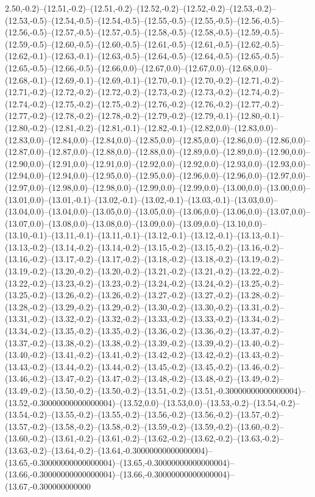 2.50,-0.2)--(12.51,-0.2)--(12.51,-0.2)--(12.52,-0.2)--(12.52,-0.2)--(12.53,-0.2)--(12.53,-0.5)--(12.54,-0.5)--(12.54,-0.5)--(12.55,-0.5)--(12.55,-0.5)--(12.56,-0.5)--(12.56,-0.5)--(12.57,-0.5)--(12.57,-0.5)--(12.58,-0.5)--(12.58,-0.5)--(12.59,-0.5)--(12.59,-0.5)--(12.60,-0.5)--(12.60,-0.5)--(12.61,-0.5)--(12.61,-0.5)--(12.62,-0.5)--(12.62,-0.1)--(12.63,-0.1)--(12.63,-0.5)--(12.64,-0.5)--(12.64,-0.5)--(12.65,-0.5)--(12.65,-0.5)--(12.66,-0.5)--(12.66,0.0)--(12.67,0.0)--(12.67,0.0)--(12.68,0.0)--(12.68,-0.1)--(12.69,-0.1)--(12.69,-0.1)--(12.70,-0.1)--(12.70,-0.2)--(12.71,-0.2)--(12.71,-0.2)--(12.72,-0.2)--(12.72,-0.2)--(12.73,-0.2)--(12.73,-0.2)--(12.74,-0.2)--(12.74,-0.2)--(12.75,-0.2)--(12.75,-0.2)--(12.76,-0.2)--(12.76,-0.2)--(12.77,-0.2)--(12.77,-0.2)--(12.78,-0.2)--(12.78,-0.2)--(12.79,-0.2)--(12.79,-0.1)--(12.80,-0.1)--(12.80,-0.2)--(12.81,-0.2)--(12.81,-0.1)--(12.82,-0.1)--(12.82,0.0)--(12.83,0.0)--(12.83,0.0)--(12.84,0.0)--(12.84,0.0)--(12.85,0.0)--(12.85,0.0)--(12.86,0.0)--(12.86,0.0)--(12.87,0.0)--(12.87,0.0)--(12.88,0.0)--(12.88,0.0)--(12.89,0.0)--(12.89,0.0)--(12.90,0.0)--(12.90,0.0)--(12.91,0.0)--(12.91,0.0)--(12.92,0.0)--(12.92,0.0)--(12.93,0.0)--(12.93,0.0)--(12.94,0.0)--(12.94,0.0)--(12.95,0.0)--(12.95,0.0)--(12.96,0.0)--(12.96,0.0)--(12.97,0.0)--(12.97,0.0)--(12.98,0.0)--(12.98,0.0)--(12.99,0.0)--(12.99,0.0)--(13.00,0.0)--(13.00,0.0)--(13.01,0.0)--(13.01,-0.1)--(13.02,-0.1)--(13.02,-0.1)--(13.03,-0.1)--(13.03,0.0)--(13.04,0.0)--(13.04,0.0)--(13.05,0.0)--(13.05,0.0)--(13.06,0.0)--(13.06,0.0)--(13.07,0.0)--(13.07,0.0)--(13.08,0.0)--(13.08,0.0)--(13.09,0.0)--(13.09,0.0)--(13.10,0.0)--(13.10,-0.1)--(13.11,-0.1)--(13.11,-0.1)--(13.12,-0.1)--(13.12,-0.1)--(13.13,-0.1)--(13.13,-0.2)--(13.14,-0.2)--(13.14,-0.2)--(13.15,-0.2)--(13.15,-0.2)--(13.16,-0.2)--(13.16,-0.2)--(13.17,-0.2)--(13.17,-0.2)--(13.18,-0.2)--(13.18,-0.2)--(13.19,-0.2)--(13.19,-0.2)--(13.20,-0.2)--(13.20,-0.2)--(13.21,-0.2)--(13.21,-0.2)--(13.22,-0.2)--(13.22,-0.2)--(13.23,-0.2)--(13.23,-0.2)--(13.24,-0.2)--(13.24,-0.2)--(13.25,-0.2)--(13.25,-0.2)--(13.26,-0.2)--(13.26,-0.2)--(13.27,-0.2)--(13.27,-0.2)--(13.28,-0.2)--(13.28,-0.2)--(13.29,-0.2)--(13.29,-0.2)--(13.30,-0.2)--(13.30,-0.2)--(13.31,-0.2)--(13.31,-0.2)--(13.32,-0.2)--(13.32,-0.2)--(13.33,-0.2)--(13.33,-0.2)--(13.34,-0.2)--(13.34,-0.2)--(13.35,-0.2)--(13.35,-0.2)--(13.36,-0.2)--(13.36,-0.2)--(13.37,-0.2)--(13.37,-0.2)--(13.38,-0.2)--(13.38,-0.2)--(13.39,-0.2)--(13.39,-0.2)--(13.40,-0.2)--(13.40,-0.2)--(13.41,-0.2)--(13.41,-0.2)--(13.42,-0.2)--(13.42,-0.2)--(13.43,-0.2)--(13.43,-0.2)--(13.44,-0.2)--(13.44,-0.2)--(13.45,-0.2)--(13.45,-0.2)--(13.46,-0.2)--(13.46,-0.2)--(13.47,-0.2)--(13.47,-0.2)--(13.48,-0.2)--(13.48,-0.2)--(13.49,-0.2)--(13.49,-0.2)--(13.50,-0.2)--(13.50,-0.2)--(13.51,-0.2)--(13.51,-0.30000000000000004)--(13.52,-0.30000000000000004)--(13.52,0.0)--(13.53,0.0)--(13.53,-0.2)--(13.54,-0.2)--(13.54,-0.2)--(13.55,-0.2)--(13.55,-0.2)--(13.56,-0.2)--(13.56,-0.2)--(13.57,-0.2)--(13.57,-0.2)--(13.58,-0.2)--(13.58,-0.2)--(13.59,-0.2)--(13.59,-0.2)--(13.60,-0.2)--(13.60,-0.2)--(13.61,-0.2)--(13.61,-0.2)--(13.62,-0.2)--(13.62,-0.2)--(13.63,-0.2)--(13.63,-0.2)--(13.64,-0.2)--(13.64,-0.30000000000000004)--(13.65,-0.30000000000000004)--(13.65,-0.30000000000000004)--(13.66,-0.30000000000000004)--(13.66,-0.30000000000000004)--(13.67,-0.300000000000